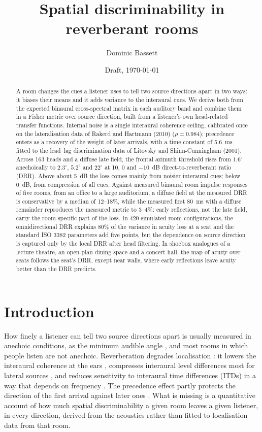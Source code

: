 \documentclass[11pt]{article}
\title{Spatial discriminability in reverberant rooms}
\author{Dominic Bassett\\\todo{affiliation, address, e-mail}}
\date{Draft, \today}
\begin{document}
\maketitle

\begin{abstract}
A room changes the cues a listener uses to tell two source directions apart in two ways: it biases their means and it adds variance to the interaural cues. We derive both from the expected binaural cross-spectral matrix in each auditory band and combine them in a Fisher metric over source direction, built from a listener's own head-related transfer functions. Internal noise is a single interaural coherence ceiling, calibrated once on the lateralisation data of Rakerd and Hartmann (2010) ($\rho=0.984$); precedence enters as a recovery of the weight of later arrivals, with a time constant of 5.6~ms fitted to the lead--lag discrimination data of Litovsky and Shinn-Cunningham (2001). Across 163 heads and a diffuse late field, the frontal azimuth threshold rises from $1.6^\circ$ anechoically to $2.3^\circ$, $5.2^\circ$ and $22^\circ$ at 10, 0 and $-10$~dB direct-to-reverberant ratio (DRR). Above about 5~dB the loss comes mainly from noisier interaural cues; below 0~dB, from compression of all cues. Against measured binaural room impulse responses of five rooms, from an office to a large auditorium, a diffuse field at the measured DRR is conservative by a median of 12--18\%, while the measured first 80~ms with a diffuse remainder reproduces the measured metric to 3--4\%: early reflections, not the late field, carry the room-specific part of the loss. In 420 simulated room configurations, the omnidirectional DRR explains 80\% of the variance in acuity loss at a seat and the standard ISO 3382 parameters add five points, but the dependence on source direction is captured only by the local DRR after head filtering. In shoebox analogues of a lecture theatre, an open-plan dining space and a concert hall, the map of acuity over seats follows the seat's DRR, except near walls, where early reflections leave acuity better than the DRR predicts.
\end{abstract}

\section{Introduction}\label{sec:intro}

How finely a listener can tell two source directions apart is usually measured in anechoic conditions, as the minimum audible angle \citep{mills1958}, and most rooms in which people listen are not anechoic. Reverberation degrades localisation \citep{hartmann1983}: it lowers the interaural coherence at the ears \citep{shinn2005}, compresses interaural level differences most for lateral sources \citep{shinn2005}, and reduces sensitivity to interaural time differences (ITDs) in a way that depends on frequency \citep{rakerd2010}. The precedence effect partly protects the direction of the first arrival against later ones \citep{litovsky1999}. What is missing is a quantitative account of how much spatial discriminability a given room leaves a given listener, in every direction, derived from the acoustics rather than fitted to localisation data from that room.
\end{document}
